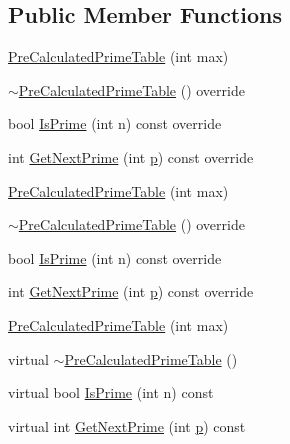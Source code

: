 \subsection*{Public Member Functions}
\begin{DoxyCompactItemize}
\item 
\mbox{\hyperlink{class_pre_calculated_prime_table_a6bb947504421e31da70d2c71576be350}{Pre\+Calculated\+Prime\+Table}} (int max)
\item 
\mbox{\hyperlink{class_pre_calculated_prime_table_aeb9fb66a80367344b6ffe9c343b73464}{$\sim$\+Pre\+Calculated\+Prime\+Table}} () override
\item 
bool \mbox{\hyperlink{class_pre_calculated_prime_table_a62be946777f7f98bbfc01edc0f15a4bb}{Is\+Prime}} (int n) const override
\item 
int \mbox{\hyperlink{class_pre_calculated_prime_table_a0b99de0a790db9f0cc2b3cd4b527fd5a}{Get\+Next\+Prime}} (int \mbox{\hyperlink{_obj__test_2lib_2googletest-master_2googlemock_2test_2gmock-matchers__test_8cc_a6bc6b007533335efe02bafff799ec64c}{p}}) const override
\item 
\mbox{\hyperlink{class_pre_calculated_prime_table_a6bb947504421e31da70d2c71576be350}{Pre\+Calculated\+Prime\+Table}} (int max)
\item 
\mbox{\hyperlink{class_pre_calculated_prime_table_aeb9fb66a80367344b6ffe9c343b73464}{$\sim$\+Pre\+Calculated\+Prime\+Table}} () override
\item 
bool \mbox{\hyperlink{class_pre_calculated_prime_table_a62be946777f7f98bbfc01edc0f15a4bb}{Is\+Prime}} (int n) const override
\item 
int \mbox{\hyperlink{class_pre_calculated_prime_table_a0b99de0a790db9f0cc2b3cd4b527fd5a}{Get\+Next\+Prime}} (int \mbox{\hyperlink{_obj__test_2lib_2googletest-master_2googlemock_2test_2gmock-matchers__test_8cc_a6bc6b007533335efe02bafff799ec64c}{p}}) const override
\item 
\mbox{\hyperlink{class_pre_calculated_prime_table_a6bb947504421e31da70d2c71576be350}{Pre\+Calculated\+Prime\+Table}} (int max)
\item 
virtual \mbox{\hyperlink{class_pre_calculated_prime_table_a6ceab295f80dbe2766b8d4f54138bbc4}{$\sim$\+Pre\+Calculated\+Prime\+Table}} ()
\item 
virtual bool \mbox{\hyperlink{class_pre_calculated_prime_table_a8a9ab7f99b09e5e987933c260e7304cf}{Is\+Prime}} (int n) const
\item 
virtual int \mbox{\hyperlink{class_pre_calculated_prime_table_a0ff10b1fe13df7e56b8d7ed9f41d3998}{Get\+Next\+Prime}} (int \mbox{\hyperlink{_obj__test_2lib_2googletest-master_2googlemock_2test_2gmock-matchers__test_8cc_a6bc6b007533335efe02bafff799ec64c}{p}}) const
\end{DoxyCompactItemize}
